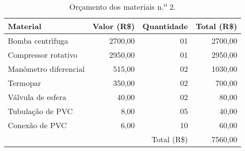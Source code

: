 \begin{table}[Htb]%
\caption{Or\c{c}amento dos materiais n.\textsuperscript{o} 2.}%
\label{tab:tab4}%
\begin{tabularx}{\textwidth}{@{\extracolsep{\fill}}lrrr}%
\toprule
Material              & \multicolumn{1}{c}{Valor (R\$)} & \multicolumn{1}{c}{Quantidade}  & \multicolumn{1}{c}{Total (R\$)} \\ \midrule
Bomba centr\'{\i}fuga      & 2700,00                         & 01                              & 2700,00                         \\
Compressor rotativo   & 2950,00                         & 01                              & 2950,00                         \\
Man\^ometro diferencial & 515,00                          & 02                              & 1030,00                         \\
Termopar              & 350,00                          & 02                              & 700,00                          \\
V\'alvula de esfera     & 40,00                           & 02                              & 80,00                           \\
Tubula\c{c}\~ao de PVC      & 8,00                            & 05                              & 40,00                           \\
Conex\~ao de PVC        & 6,00                            & 10                              & 60,00                           \\ \midrule
                      &                                 & \multicolumn{1}{r}{Total (R\$)} & 7560,00                         \\ \bottomrule
\end{tabularx}
\end{table}

